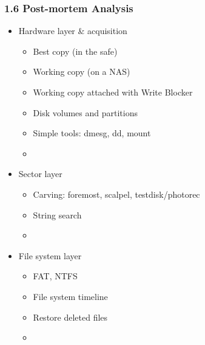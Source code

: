 \begin{frame}
  \frametitle{1.6 Post-mortem Analysis}
  \begin{itemize}
      \item Hardware layer \& acquisition
        \begin{itemize}
            \item[] Best copy (in the safe)
            \item[] Working copy (on a NAS)
            \item[] Working copy attached with Write Blocker
            \item[] Disk volumes and partitions
            \item[] Simple tools: dmesg, dd, mount
            \item[]
        \end{itemize}
      \item Sector layer
        \begin{itemize}
            \item[] Carving: foremost, scalpel, testdisk/photorec
            \item[] String search
            \item[]
        \end{itemize}
      \item File system layer
        \begin{itemize}
            \item[] FAT, NTFS
            \item[] File system timeline
            \item[] Restore deleted files
            \item[]
        \end{itemize}
  \end{itemize}
\end{frame}


